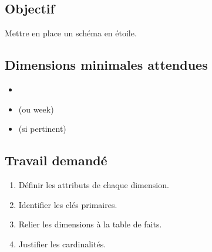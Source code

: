 \documentclass[11pt,a4paper]{article}
\begin{document}
\subsection*{Objectif}

Mettre en place un schéma en étoile.

\subsection*{Dimensions minimales attendues}

\begin{itemize}
  \item {}
  \item {} (ou week)
  \item {} (si pertinent)
\end{itemize}

\subsection*{Travail demandé}

\begin{enumerate}
  \item Définir les attributs de chaque dimension.
  \item Identifier les clés primaires.
  \item Relier les dimensions à la table de faits.
  \item Justifier les cardinalités.
\end{enumerate}
\end{document}
